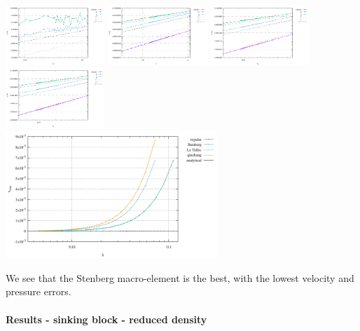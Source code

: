\begin{center}
\includegraphics[width=3.74cm]{python_codes/fieldstone_78/results/aquarium/errors_regular.pdf}
\includegraphics[width=3.74cm]{python_codes/fieldstone_78/results/aquarium/errors_stenberg.pdf}
\includegraphics[width=3.74cm]{python_codes/fieldstone_78/results/aquarium/errors_letallec.pdf}
\includegraphics[width=3.74cm]{python_codes/fieldstone_78/results/aquarium/errors_qinzhang.pdf}\\
\includegraphics[width=8cm]{python_codes/fieldstone_78/results/aquarium/vrms.pdf}
\end{center}

We see that the Stenberg macro-element is the best, with the lowest velocity and pressure errors.


\newpage
\paragraph{Results - sinking block - reduced density}

